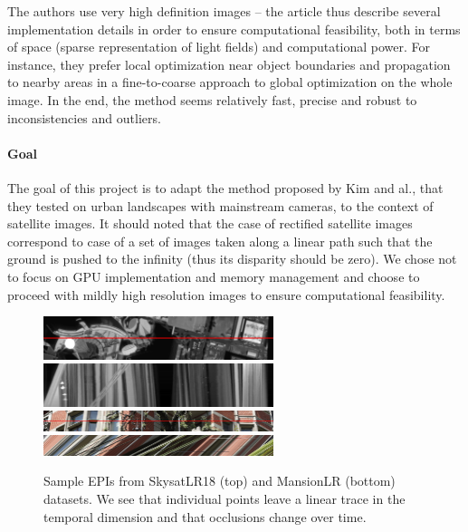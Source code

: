 \documentclass{article}
\def\epiWidth{0.6}
\theoremstyle{definition}
\begin{document}
The authors use very high definition images -- the article thus describe several implementation details in order to ensure computational feasibility, both in terms of space (sparse representation of light fields) and computational power. For instance, they prefer local optimization near object boundaries and propagation to nearby areas in a fine-to-coarse approach to global optimization on the whole image. In the end, the method seems relatively fast, precise and robust to inconsistencies and outliers.


\paragraph{Goal} The goal of this project is to adapt the method proposed by Kim and al., that they tested on urban landscapes with mainstream cameras, to the context of satellite images. It should noted that the case of rectified satellite images correspond to case of a set of images taken along a linear path such that the ground is pushed to the infinity (thus its disparity should be zero). We chose not to focus on GPU implementation and memory management and choose to proceed with mildly high resolution images to ensure computational feasibility.


\begin{figure}[t]
  \centering
  \includegraphics[width=\epiWidth\textwidth]{images/1519991772641_1st.png}\\
  \includegraphics[width=\epiWidth\textwidth]{images/1519991772641_epi.png}\\
  \includegraphics[width=\epiWidth\textwidth]{images/1521725699383_1st.png}\\[0.5cm]
  \includegraphics[width=\epiWidth\textwidth]{images/1521725699383_epi.png}
  \caption{Sample EPIs from SkysatLR18 (top) and MansionLR (bottom) datasets. We see that individual points leave a linear trace in the temporal dimension and that occlusions change over time.}
  \label{fig:exepi}
\end{figure}
\end{document}
